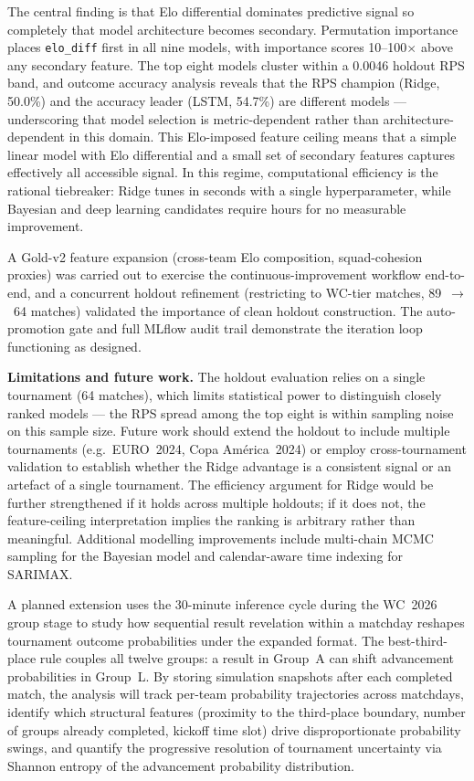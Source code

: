 \documentclass[conference]{IEEEtran}
\begin{document}
The central finding is that Elo differential dominates predictive signal so
completely that model architecture becomes secondary.  Permutation importance
places \texttt{elo\_diff} first in all nine models, with importance scores
10--100$\times$ above any secondary feature.  The top eight models cluster
within a 0.0046 holdout RPS band, and outcome accuracy analysis reveals
that the RPS champion (Ridge, 50.0\%) and the accuracy leader (LSTM,
54.7\%) are different models --- underscoring that model selection is
metric-dependent rather than architecture-dependent in this domain.  This
Elo-imposed feature ceiling means that a simple linear model with Elo
differential and a small set of secondary features captures effectively all
accessible signal.  In this regime, computational efficiency is the rational
tiebreaker: Ridge tunes in seconds with a single hyperparameter, while
Bayesian and deep learning candidates require hours for no measurable
improvement.

A Gold-v2 feature expansion (cross-team Elo composition, squad-cohesion
proxies) was carried out to exercise the continuous-improvement workflow
end-to-end, and a concurrent holdout refinement (restricting to WC-tier
matches, 89~$\to$~64 matches) validated the importance of clean holdout
construction.  The auto-promotion gate and full MLflow audit trail
demonstrate the iteration loop functioning as designed.

\textbf{Limitations and future work.}
The holdout evaluation relies on a single tournament (64 matches), which
limits statistical power to distinguish closely ranked models --- the
RPS spread among the top eight is within sampling noise on this sample size.
Future work should extend the holdout to include multiple tournaments
(e.g.\ EURO~2024, Copa América~2024) or employ cross-tournament validation
to establish whether the Ridge advantage is a consistent signal or an
artefact of a single tournament.  The efficiency argument for Ridge would
be further strengthened if it holds across multiple holdouts; if it does
not, the feature-ceiling interpretation implies the ranking is arbitrary
rather than meaningful.  Additional modelling improvements include
multi-chain MCMC sampling for the Bayesian model and calendar-aware time
indexing for SARIMAX.

A planned extension uses the 30-minute inference cycle during the
WC~2026 group stage to study how sequential result revelation within a
matchday reshapes tournament outcome probabilities under the expanded
format.  The best-third-place rule couples all twelve groups: a result in
Group~A can shift advancement probabilities in Group~L.  By storing
simulation snapshots after each completed match, the analysis will track
per-team probability trajectories across matchdays, identify which
structural features (proximity to the third-place boundary, number of
groups already completed, kickoff time slot) drive disproportionate
probability swings, and quantify the progressive resolution of tournament
uncertainty via Shannon entropy of the advancement probability
distribution.



\end{document}
